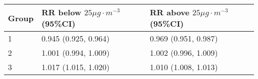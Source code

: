 \begin{tabular}{lll}
  \hline
Group & RR below $25 \mu g \cdot m^{-3}$ (95\%CI) & RR above $25 \mu g \cdot m^{-3}$ (95\%CI) \\ 
  \hline
   1 & 0.945 (0.925, 0.964) & 0.969 (0.951, 0.987) \\ 
     2 & 1.001 (0.994, 1.009) & 1.002 (0.996, 1.009) \\ 
     3 & 1.017 (1.015, 1.020) & 1.010 (1.008, 1.013) \\ 
   \hline
\end{tabular}

